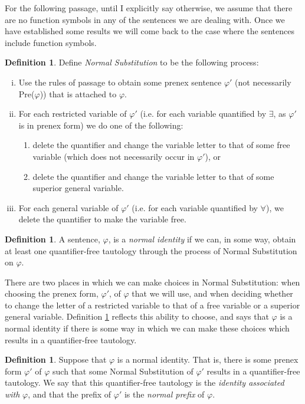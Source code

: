 \documentclass[a4paper,12pt]{report}
\theoremstyle{definition}
\newtheorem{mydef}[lem]{Definition}
\begin{document}
For the following passage, until I explicitly say otherwise, we assume that there are no function symbols in any of the sentences we are dealing with. Once we have established some results we will come back to the case where the sentences include function symbols.

\begin{mydef}
\label{hnorm}
Define \emph{Normal Substitution} to be the following process:
\begin{enumerate}[(i)]
\item Use the rules of passage to obtain some prenex sentence $\varphi'$ (not necessarily Pre($\varphi$)) that is attached to $\varphi$. 
\item For each restricted variable of $\varphi'$ (i.e. for each variable quantified by $\exists$, as $\varphi'$ is in prenex form) we do one of the following:
\begin{enumerate}
\item delete the quantifier and change the variable letter to that of some free variable (which does not necessarily occur in $\varphi'$), or
\item delete the quantifier and change the variable letter to that of some superior general variable.
\end{enumerate}
\item For each general variable of $\varphi'$ (i.e. for each variable quantified by $\forall$), we delete the quantifier to make the variable free.
\end{enumerate}
\end{mydef}

\begin{mydef}
\label{normaldef} 
A sentence, $\varphi$, is a \emph{normal identity} if we can, in some way, obtain at least one quantifier-free tautology through the process of Normal Substitution on $\varphi$.
\end{mydef}

There are two places in which we can make choices in Normal Substitution: when choosing the prenex form, $\varphi'$, of $\varphi$ that we will use, and when deciding whether to change the letter of a restricted variable to that of a free variable or a superior general variable. Definition \ref{normaldef} reflects this ability to choose, and says that $\varphi$ is a normal identity if there is some way in which we can make these choices which results in a quantifier-free tautology.

\begin{mydef} 
Suppose that $\varphi$ is a normal identity. That is, there is some prenex form $\varphi'$ of $\varphi$ such that some Normal Substitution of $\varphi'$ results in a quantifier-free tautology. We say that this quantifier-free tautology is the \emph{identity associated with} $\varphi$, and that the prefix of $\varphi'$ is the \emph{normal prefix} of $\varphi$.
\end{mydef}
\end{document}
